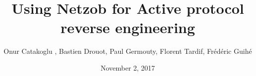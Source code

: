 \documentclass{beamer}
\newcounter{m} %
\newcounter{c} %
\begin{document}




\title{Using Netzob for Active protocol reverse engineering }   
\author{Onur Catakoglu , Bastien Drouot, Paul Germouty, Florent Tardif,  Fr\'{e}d\'{e}ric Guih\'{e}} 
\date{November 2, 2017} 



\end{document}

